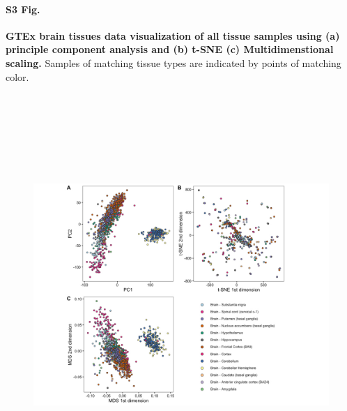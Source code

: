 \documentclass[10pt,letterpaper]{article}
\begin{document}
\paragraph*{S3 Fig.}

\label{figS3}
{\bf GTEx brain tissues data visualization of all tissue samples using (a) principle component analysis and (b) t-SNE (c) Multidimenstional scaling.}
Samples of matching tissue types are indicated by points of matching color.
\begin{figure}[ht]
\centering
\includegraphics[height=6in, width=6in]{../../src/figure/gtex-brain-other-methods.Rmd/gtex-brain-with-legend.jpeg}
\end{figure}
\end{document}
